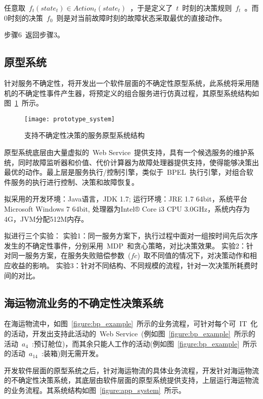 任意取~$f_t(state_t) \in Action_t(state_t)$~，于是定义了~$t$~时刻的决策规则~$f_t$~。而0时刻的决策~$f_0$~则是对当前故障时刻的故障状态采取最优的直接动作。

步骤6~返回步骤3。


\subsection{原型系统}
针对服务不确定性，将开发出一个软件层面的不确定性原型系统，此系统将采用随机的不确定性事件产生器，将预定义的组合服务进行仿真过程，其原型系统结构如图~\ref{figure:prototype_system}~所示。

\begin{figure}[htbp]
    \centering
    \texttt{[image: prototype\_system]}
    \caption{支持不确定性决策的服务原型系统结构}\label{figure:prototype_system}
    \vspace{-1em}
\end{figure}

原型系统底层由大量虚拟的~Web Service~提供支持，具有一个候选服务的维护系统，同时故障监听器和价值、代价计算器为故障处理器提供支持，使得能够决策出最优的动作。最上层是服务执行/控制引擎，类似于~BPEL~执行引擎，对组合软件服务的执行进行控制、决策和故障恢复。

拟采用的开发环境：Java语言，JDK 1.7; 运行环境：JRE 1.7 64bit，系统平台Microsoft Windows 7 64bit, 处理器为Intel® Core i3 CPU 3.0GHz，系统内存为4G，JVM分配512M内存。

拟进行三个实验：
实验1：同一服务方案下，执行过程中面对一组按时间先后次序发生的不确定性事件，分别采用~MDP~和贪心策略，对比决策效果。
实验2：针对同一服务方案，在服务失败赔偿参数~($fc$)~取不同值的情况下，对决策动作和相应收益的影响。
实验3：针对不同结构、不同规模的流程，针对一次决策所耗费时间的对比。

\subsection{海运物流业务的不确定性决策系统}

在海运物流中，如图~\ref{figure:bp_example}~所示的业务流程，可针对每个可~IT~化的活动，开发出支持此活动的~Web Service~(例如图~\ref{figure:bp_example}~所示的活动~$a_{4}$~:预订舱位)，而其余只能人工作的活动(例如图~\ref{figure:bp_example}~所示的活动~$a_{14}$~:装箱)则无需开发。

开发软件层面的原型系统之后，针对海运物流的具体业务流程，开发针对海运物流的不确定性决策系统，其底层由软件层面的原型系统提供支持，上层运行海运物流的业务流程。其系统结构如图~\ref{figure:app_system}~所示。

